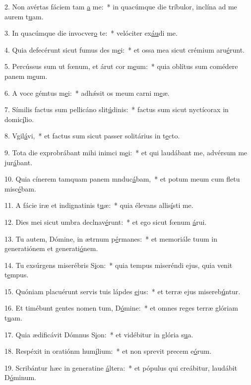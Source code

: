 2. Non avértas fáciem tam \uline{a} me:~* in quacúmque die tríbulor, inclína ad me aurem t\uline{u}am.\par 
3. In quacúmque die invocver\uline{o} te:~* velóciter ex\uline{áu}di me.\par 
4. Quia defecérunt sicut fumus des m\uline{e}i:~* et ossa mea sicut crémium aru\uline{é}runt.\par 
5. Percússus sum ut fœnum, et árut cor m\uline{e}um:~* quia oblítus sum comédere panem m\uline{e}um.\par 
6. A voce gémtus m\uline{e}i:~* adhǽsit os meum carni m\uline{e}æ.\par 
7. Símilis factus sum pellicáno slit\uline{ú}dinis:~* factus sum sicut nyctícorax in domic\uline{í}lio.\par 
8. Vgil\uline{á}vi,~* et factus sum sicut passer solitárius in t\uline{e}cto.\par 
9. Tota die exprobrábant mihi inimci m\uline{e}i:~* et qui laudábant me, advérsum me jur\uline{á}bant.\par 
10. Quia cínerem tamquam panem mnduc\uline{á}bam,~* et potum meum cum fletu misc\uline{é}bam.\par 
11. A fácie iræ et indignatinis t\uline{u}æ:~* quia élevans allis\uline{í}sti me.\par 
12. Dies mei sicut umbra declnav\uline{é}runt:~* et ego sicut fœnum \uline{á}rui.\par 
13. Tu autem, Dómine, in ætrnum p\uline{é}rmanes:~* et memoriále tuum in generatiónem et generati\uline{ó}nem.\par 
14. Tu exsúrgens miserébris S\uline{i}on:~* quia tempus miseréndi ejus, quia venit t\uline{e}mpus.\par 
15. Quóniam placuérunt servis tuis lápdes \uline{e}jus:~* et terræ ejus misereb\uline{ú}ntur.\par 
16. Et timébunt gentes nomen tum, D\uline{ó}mine:~* et omnes reges terræ glóriam t\uline{u}am.\par 
17. Quia ædificávit Dómnus S\uline{i}on:~* et vidébitur in glória s\uline{u}a.\par 
18. Respéxit in oratiónm hum\uline{í}lium:~* et non sprevit precem e\uline{ó}rum.\par 
19. Scribántur hæc in generatine \uline{á}ltera:~* et pópulus qui creábitur, laudábit D\uline{ó}minum.\par 
